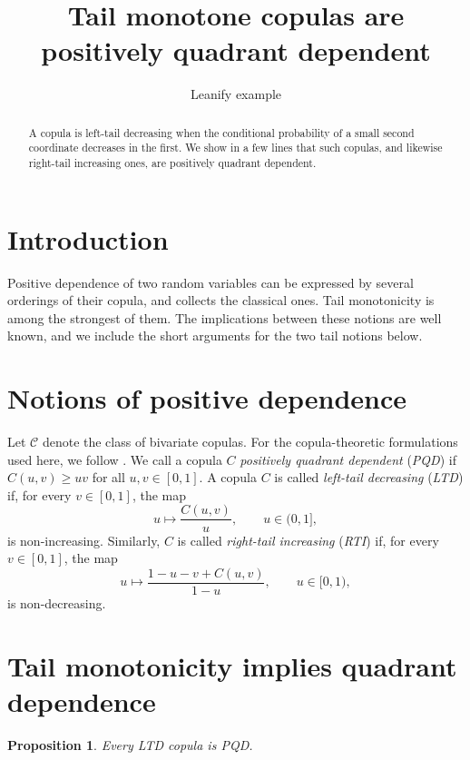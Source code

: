 \documentclass{article}
\title{Tail monotone copulas are positively quadrant dependent}
\author{Leanify example}
\date{}
\newtheorem{proposition}{Proposition}
\newcommand{\CC}{\mathcal{C}}
\begin{document}
\maketitle

\begin{abstract}
A copula is left-tail decreasing when the conditional probability of a small second coordinate decreases in the first.
We show in a few lines that such copulas, and likewise right-tail increasing ones, are positively quadrant dependent.
\end{abstract}

\section{Introduction}

Positive dependence of two random variables can be expressed by several orderings of their copula, and \cite[Ch.~5]{nelsen2006introduction} collects the classical ones.
Tail monotonicity is among the strongest of them.
The implications between these notions are well known, and we include the short arguments for the two tail notions below.

\section{Notions of positive dependence}

Let $\CC$ denote the class of bivariate copulas.
For the copula-theoretic formulations used here, we follow \cite[Ch.~5]{nelsen2006introduction}.
We call a copula $C$ \emph{positively quadrant dependent} (\emph{PQD}) if $C(u,v)\ge uv$ for all $u,v\in[0,1]$.
A copula $C$ is called \emph{left-tail decreasing} (\emph{LTD}) if, for every $v\in[0,1]$, the map
\begin{equation}\label{eq:ltd}
u\longmapsto\frac{C(u,v)}{u},\qquad u\in(0,1],
\end{equation}
is non-increasing.
Similarly, $C$ is called \emph{right-tail increasing} (\emph{RTI}) if, for every $v\in[0,1]$, the map
\begin{equation}\label{eq:rti}
u\longmapsto\frac{1-u-v+C(u,v)}{1-u},\qquad u\in[0,1),
\end{equation}
is non-decreasing.

\section{Tail monotonicity implies quadrant dependence}

\begin{proposition}\label{prop:ltd}
Every LTD copula is PQD.
\end{proposition}
\end{document}
